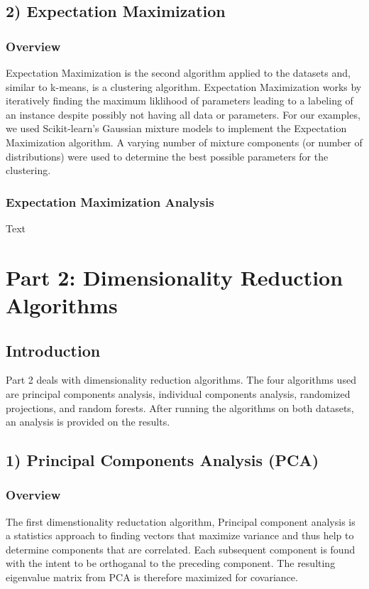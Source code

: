 \documentclass[h]{article}
\begin{document}
\subsection*{2) Expectation Maximization}  
\subsubsection*{Overview}
Expectation Maximization is the second algorithm applied to the datasets and, 
similar to k-means, is a clustering algorithm.  Expectation Maximization works 
by iteratively finding the maximum liklihood of parameters leading to a labeling 
of an instance despite possibly not having all data or parameters.  For our 
examples, we used Scikit-learn's Gaussian mixture models to implement the 
Expectation Maximization algorithm.  A varying number of mixture components (or number of distributions) were 
used to determine the best possible parameters for the clustering.

\subsubsection*{Expectation Maximization Analysis}
Text








 
\section*{Part 2: Dimensionality Reduction Algorithms}
\subsection*{ Introduction}  
Part 2 deals with dimensionality reduction algorithms.  The four algorithms used 
are principal components analysis, individual components analysis, randomized projections, and random 
forests.  After running the algorithms on both datasets, an analysis is provided 
on the results.

\subsection*{1) Principal Components Analysis (PCA)}  
\subsubsection*{Overview}
The first dimenstionality reductation algorithm, Principal component analysis is a statistics approach to finding vectors that 
maximize variance and thus help to determine components that are correlated.  Each subsequent component is found with the intent to be 
orthoganal to the preceding component.  The resulting eigenvalue matrix from PCA 
is therefore maximized for covariance.
\end{document}
